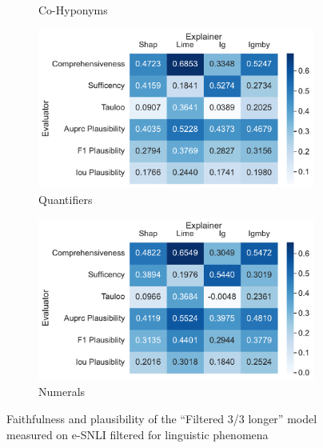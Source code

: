 \begin{figure}[t!]
\begin{subfigure}{0.49\textwidth}
        \caption{Co-Hyponyms}
    \end{subfigure}
    \begin{subfigure}{0.49\textwidth}
        \includegraphics[width=\textwidth]{./images/ferret_heatmaps_phenomena/filtered_3_3_longer/quantifiers.pdf}
        \caption{Quantifiers}
    \end{subfigure}
    \begin{subfigure}{0.49\textwidth}
        \includegraphics[width=\textwidth]{./images/ferret_heatmaps_phenomena/filtered_3_3_longer/numericals.pdf}
        \caption{Numerals}
    \end{subfigure}
    \caption{Faithfulness and plausibility of the \enquote{Filtered 3/3 longer} model measured on \acs{e-SNLI} filtered for linguistic phenomena}
    \label{fig:ferret-filtered}
\end{figure}